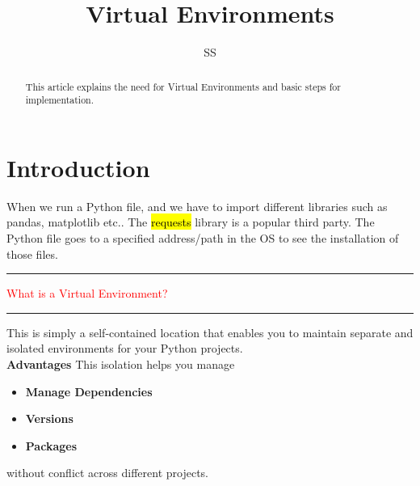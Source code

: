 \documentclass{article}
\title{Virtual Environments}
\author{SS}
\begin{document}
\maketitle

\begin{abstract}
This article explains the need for Virtual Environments and basic steps for implementation.
\end{abstract}

\section{Introduction}
When we run a Python file, and we have to import different libraries such as pandas, matplotlib etc.. The \hl{requests} library is a popular third party. The Python file goes to a specified address/path in the OS to see the installation of those files.  \\
% 
\noindent
{\color{red} \rule{\linewidth}{0.5mm}}
\textcolor{red}{What is a Virtual Environment?} \\
\noindent
{\color{red} \rule{\linewidth}{0.5mm}}
This is simply a self-contained location that enables you to maintain separate and isolated environments for your Python projects.  
\\
\textbf{Advantages} This isolation helps you manage
\begin{itemize}
\color{blue}
\item \textbf{Manage Dependencies}
\item \textbf{Versions}
\item \textbf{Packages}
\end{itemize}
without conflict across different projects.
\\
\end{document}
